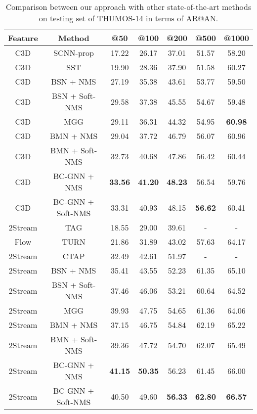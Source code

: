 \documentclass[runningheads]{llncs}
\begin{document}
\begin{table}
\setlength{\abovecaptionskip}{-1.7cm}
\caption{Comparison between our approach with other state-of-the-art methods on testing set of THUMOS-14 in terms of AR@AN.}
\setlength{\tabcolsep}{2mm}
\centering
\begin{tabular}{ccccccc}
\hline
Feature & Method        & @50   & @100  & @200      & @500  & @1000 \\ \hline
C3D     & SCNN-prop \cite{SCNN-prop}    & 17.22 & 26.17 & 37.01     & 51.57 & 58.20 \\
C3D     & SST \cite{SST}        & 19.90 & 28.36 & 37.90     & 51.58 & 60.27 \\
C3D     & BSN \cite{BSN} + NMS           & 27.19 & 35.38 & 43.61     & 53.77 & 59.50 \\
C3D     & BSN + Soft-NMS           & 29.58 & 37.38 & 45.55     & 54.67 & 59.48 \\
C3D     & MGG \cite{MGG}         & 29.11 & 36.31 & 44.32     & 54.95 & \textbf{60.98} \\
C3D     & BMN \cite{BMN} + NMS           & 29.04 & 37.72 & 46.79     & 56.07 & 60.96 \\
C3D     & BMN + Soft-NMS           & 32.73 & 40.68 & 47.86     & 56.42 & 60.44 \\ \hline
C3D     & BC-GNN + NMS  & \textbf{33.56} & \textbf{41.20} &  \textbf{48.23}   & 56.54 &
59.76  \\
C3D     & BC-GNN + Soft-NMS  & 33.31 & 40.93 &  48.15   & \textbf{56.62} &
60.41  \\
\hline
2Stream & TAG \cite{TAG}         & 18.55 & 29.00 & 39.61     & -     & -     \\
Flow    & TURN \cite{TURN}         & 21.86 & 31.89 & 43.02     & 57.63 & 64.17 \\
2Stream & CTAP \cite{CTAP}         & 32.49 & 42.61 & 51.97     & -     & -     \\
2Stream & BSN \cite{BSN} + NMS          & 35.41 & 43.55 & 52.23     & 61.35 & 65.10 \\
2Stream & BSN  + Soft-NMS           & 37.46 & 46.06 & 53.21     & 60.64 & 64.52 \\
2Stream & MGG \cite{MGG}          & 39.93 & 47.75 & 54.65     & 61.36 & 64.06 \\
2Stream & BMN \cite{BMN} + NMS          & 37.15 & 46.75 & 54.84     & 62.19 & 65.22 \\
2Stream & BMN + Soft-NMS          & 39.36 & 47.72 & 54.70     & 62.07 & 65.49 \\ \hline
2Stream & BC-GNN + NMS    & \textbf{41.15} & \textbf{50.35} & 56.23     & 61.45 &66.00  \\
2Stream & BC-GNN + Soft-NMS    & 40.50 & 49.60 & \textbf{56.33}     & \textbf{62.80} &\textbf{66.57} \\


\hline
\end{tabular}
\label{thomas auc table}
\end{table}
\end{document}
